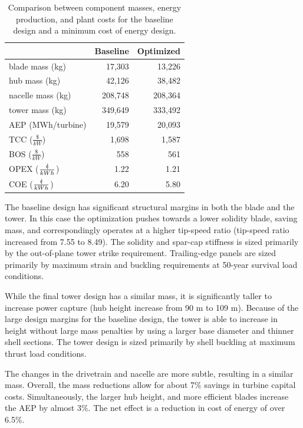 \documentclass[]{aiaa-tc} %
\newcommand{\cent}{{\mathrm{c}\mkern-6.5mu{\mid}}}
\begin{document}
    \begin{table}[htb]
    \centering
    \caption{Comparison between component masses, energy production, and plant costs for the baseline design and a minimum cost of energy design.}
    \label{tab:wind_results}
    \begin{tabular}{@{}lrr@{}}
    \toprule
     &  Baseline & Optimized  \\
    \midrule
    blade mass (kg) & 17,303 & 13,226  \\
    hub mass (kg) & 42,126 & 38,482  \\
    nacelle mass (kg) & 208,748 & 208,364  \\
    tower mass (kg) & 349,649 & 333,492  \\
    AEP (MWh/turbine) &  19,579 & 20,093  \\
    TCC ($\frac{\$}{kW}$) &  1,698 & 1,587  \\
    BOS ($\frac{\$}{kW}$) &  558 & 561  \\
    OPEX ($\frac{\cent}{kWh}$) &  1.22 & 1.21  \\
    COE ($\frac{\cent}{kWh}$) &  6.20 & 5.80  \\
    \bottomrule
    \end{tabular}
    \end{table}

      The baseline design has significant structural margins in both the blade and the tower.  In this case the optimization pushes towards a lower solidity blade, saving mass, and correspondingly operates at a higher tip-speed ratio (tip-speed ratio increased from 7.55 to 8.49).  The solidity and spar-cap stiffness is sized primarily by the out-of-plane tower strike requirement.  Trailing-edge panels are sized primarily by maximum strain and buckling requirements at 50-year survival load conditions.

      While the final tower design has a similar mass, it is significantly taller to increase power capture (hub height increase from 90 m to 109 m).  Because of the large design margins for the baseline design, the tower is able to increase in height without large mass penalties by using a larger base diameter and thinner shell sections.  The tower design is sized primarily by shell buckling at maximum thrust load conditions.

      The changes in the drivetrain and nacelle are more subtle, resulting in a similar mass.  Overall, the mass reductions allow for about 7\% savings in turbine capital costs.  Simultaneously, the larger hub height, and more efficient blades increase the AEP by almost 3\%.  The net effect is a reduction in cost of energy of over 6.5\%.
\end{document}
